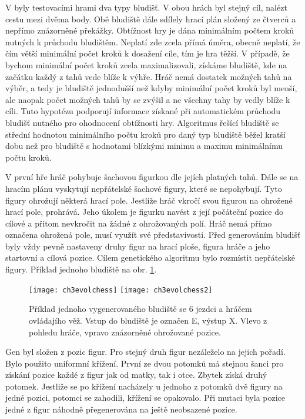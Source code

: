 V \cite{17Evol} byly testovacími hrami dva typy bludišť. V obou hrách byl stejný cíl, nalézt cestu mezi dvěma body. Obě bludiště dále sdílely hrací plán složený ze čtverců a nepřímo znázorněné překážky. Obtížnost hry je dána minimálním počtem kroků nutných k průchodu bludištěm. Neplatí zde zcela přímá úměra, obecně neplatí, že čím větší minimální počet kroků k dosažení cíle, tím je hra těžší. V případě, že bychom minimální počet kroků zcela maximalizovali, získáme bludiště, kde na začátku každý z tahů vede blíže k výhře. Hráč nemá dostatek možných tahů na výběr, a tedy je bludiště jednodušší než kdyby minimální počet kroků byl menší, ale naopak počet možných tahů by se zvýšil a ne všechny tahy by vedly blíže k cíli. Tuto hypotézu podporují informace získané při automatickém průchodu bludišť nutného pro ohodnocení obtížnosti hry. Algoritmus řešící bludiště se střední hodnotou minimálního počtu kroků pro daný typ bludiště běžel kratší dobu než pro bludiště s hodnotami blízkými minimu a maximu minimálnímu počtu kroků.

V první hře hráč pohybuje šachovou figurkou dle jejích platných tahů. Dále se na hracím plánu vyskytují nepřátelské šachové figury, které se nepohybují. Tyto figury ohrožují některá hrací pole. Jestliže hráč vkročí svou figurou na ohrožené hrací pole, prohrává. Jeho úkolem je figurku navést z její počáteční pozice do cílové a přitom nevkročit na žádné z ohrožovaných polí. Hráč nemá přímo označena ohrožená pole, musí využít své představivosti. Před generováním bludišť byly vždy pevně nastaveny druhy figur na hrací ploše, figura hráče a jeho startovní a cílová pozice. Cílem genetického algoritmu bylo rozmístit nepřátelské figury. Příklad jednoho bludiště na obr. \ref{fig-ch3evolchess}.

\begin{figure}
  \centering
  \texttt{[image: ch3evolchess]}
	\texttt{[image: ch3evolchess2]}
	\caption{Příklad jednoho vygenerovaného bludiště se 6 jezdci a hráčem ovládajího věž. Vstup do bludiště je označen E, výstup X. Vlevo z pohledu hráče, vpravo znázorněné ohrožované pozice. \cite{17Evol} }
	\label{fig-ch3evolchess}
\end{figure}

Gen byl složen z pozic figur. Pro stejný druh figur nezáleželo na jejich pořadí. Bylo použito uniformní křížení. První ze dvou potomků má stejnou šanci pro získání pozice každé z figur jak od matky, tak i otce. Zbytek získá druhý potomek. Jestliže se po křížení nacházely u jednoho z potomků dvě figury na jedné pozici, potomci se zahodili, křížení se opakovalo. Při mutaci byla pozice jedné z figur náhodně přegenerována na ještě neobsazené pozice.

